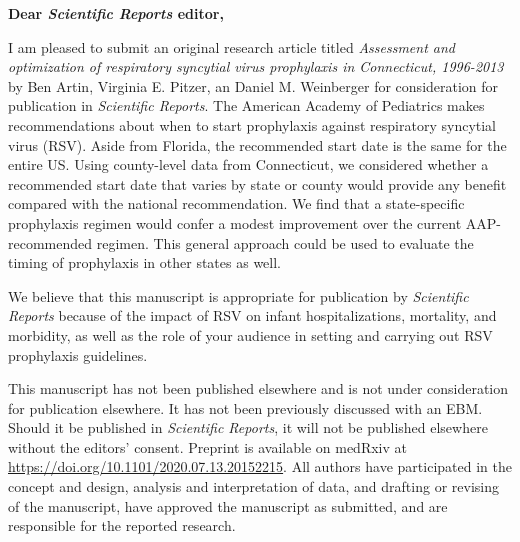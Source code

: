 \documentclass[10pt]{letter} %
\begin{document}

\begin{letter}{} %


\opening{\textbf{Dear \textit{Scientific Reports} editor,}}

I am pleased to submit an original research article titled \textit{Assessment and optimization of respiratory syncytial virus prophylaxis in Connecticut, 1996-2013} by Ben Artin, Virginia E. Pitzer, an Daniel M. Weinberger for consideration for publication in \textit{Scientific Reports}. The American Academy of Pediatrics makes recommendations about when to start prophylaxis against respiratory syncytial virus (RSV). Aside from Florida, the recommended start date is the same for the entire US. Using county-level data from Connecticut, we considered whether a recommended start date that varies by state or county would provide any benefit compared with the national recommendation. We find that a state-specific prophylaxis regimen would confer a modest improvement over the current AAP-recommended regimen. This general approach could be used to evaluate the timing of prophylaxis in other states as well.

We believe that this manuscript is appropriate for publication by \textit{Scientific Reports} because of the impact of RSV on infant hospitalizations, mortality, and morbidity, as well as the role of your audience in setting and carrying out RSV prophylaxis guidelines. 

This manuscript has not been published elsewhere and is not under consideration for publication elsewhere. It has not been previously discussed with an EBM. Should it be published in \textit{Scientific Reports}, it will not be published elsewhere without the editors' consent. Preprint is available on medRxiv at \url{https://doi.org/10.1101/2020.07.13.20152215}. All authors have participated in the concept and design, analysis and interpretation of data, and drafting or revising of the manuscript, have approved the manuscript as submitted, and are responsible for the reported research.


\end{letter}
\end{document}
